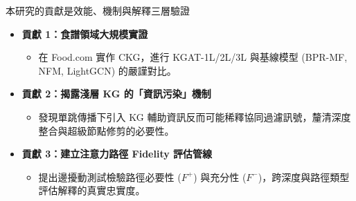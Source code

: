 \documentclass[aspectratio=169, 10pt]{beamer}
\begin{document}
\begin{frame}{本研究的貢獻是效能、機制與解釋三層驗證}
  \begin{itemize}
    \item \textbf{貢獻 1：食譜領域大規模實證}
      \begin{itemize}
        \item 在 Food.com 實作 CKG，進行 KGAT-1L/2L/3L 與基線模型 (BPR-MF, NFM, LightGCN) 的嚴謹對比。
      \end{itemize}
    \item \textbf{貢獻 2：揭露淺層 KG 的「資訊污染」機制}
      \begin{itemize}
        \item 發現單跳傳播下引入 KG 輔助資訊反而可能稀釋協同過濾訊號，釐清深度整合與超級節點修剪的必要性。
      \end{itemize}
    \item \textbf{貢獻 3：建立注意力路徑 Fidelity 評估管線}
      \begin{itemize}
        \item 提出邊擾動測試檢驗路徑必要性 ($F^+$) 與充分性 ($F^-$)，跨深度與路徑類型評估解釋的真實忠實度。
      \end{itemize}
  \end{itemize}
\end{frame}
\end{document}
